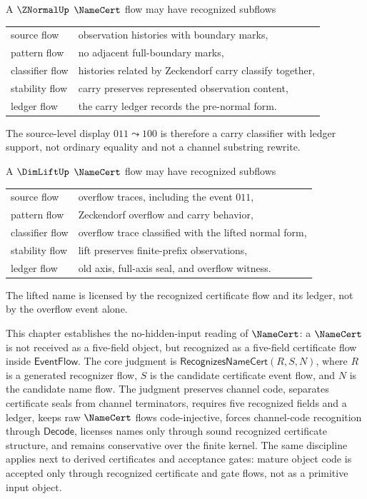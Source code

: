 \begin{example}
\label{ex:namecert-generated-znormal-namecert-flow}
A $\ZNormalUp$ $\NameCert$ flow may have recognized subflows
\begin{center}
\begin{tabular}{ll}
  source flow & observation histories with boundary marks, \\
  pattern flow & no adjacent full-boundary marks, \\
  classifier flow & histories related by Zeckendorf carry classify together, \\
  stability flow & carry preserves represented observation content, \\
  ledger flow & the carry ledger records the pre-normal form.
\end{tabular}
\end{center}
The source-level display $011 \leadsto 100$ is therefore a carry classifier with ledger support, not ordinary equality and not a channel substring rewrite.
\end{example}

\begin{example}
\label{ex:namecert-generated-dimlift-namecert-flow}
A $\DimLiftUp$ $\NameCert$ flow may have recognized subflows
\begin{center}
\begin{tabular}{ll}
  source flow & overflow traces, including the event $011$, \\
  pattern flow & Zeckendorf overflow and carry behavior, \\
  classifier flow & overflow trace classified with the lifted normal form, \\
  stability flow & lift preserves finite-prefix observations, \\
  ledger flow & old axis, full-axis seal, and overflow witness.
\end{tabular}
\end{center}
The lifted name is licensed by the recognized certificate flow and its ledger, not by the overflow event alone.
\end{example}

\begin{remark}[Outlook]
\label{rem:namecert-generated-outlook}
This chapter establishes the no-hidden-input reading of $\NameCert$: a $\NameCert$ is not received as a five-field object, but recognized as a five-field certificate flow inside $\mathsf{EventFlow}$. The core judgment is $\mathsf{RecognizesNameCert}(R,S,N)$, where $R$ is a generated recognizer flow, $S$ is the candidate certificate event flow, and $N$ is the candidate name flow. The judgment preserves channel code, separates certificate seals from channel terminators, requires five recognized fields and a ledger, keeps raw $\NameCert$ flows code-injective, forces channel-code recognition through $\mathsf{Decode}$, licenses names only through sound recognized certificate structure, and remains conservative over the finite kernel. The same discipline applies next to derived certificates and acceptance gates: mature object code is accepted only through recognized certificate and gate flows, not as a primitive input object.
\end{remark}
